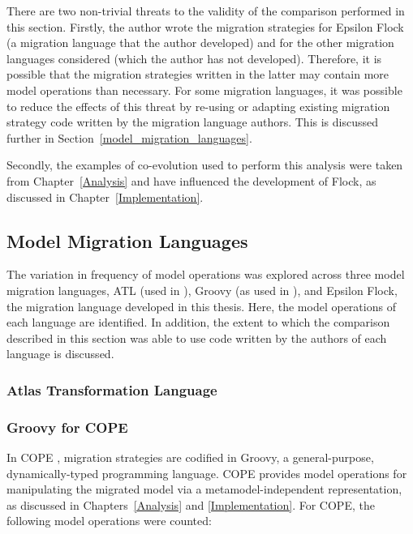There are two non-trivial threats to the validity of the comparison performed in this section. Firstly, the author wrote the migration strategies for Epsilon Flock (a migration language that the author developed) and for the other migration languages considered (which the author has not developed). Therefore, it is possible that the migration strategies written in the latter may contain more model operations than necessary. For some migration languages, it was possible to reduce the effects of this threat by re-using or adapting existing migration strategy code written by the migration language authors. This is discussed further in Section~\ref{model_migration_languages}.

Secondly, the examples of co-evolution used to perform this analysis were taken from Chapter~\ref{Analysis} and have influenced the development of Flock, as discussed in Chapter~\ref{Implementation}.  %


\subsection{Model Migration Languages}
\label{subsec:model_migration_languages}
The variation in frequency of model operations was explored across three model migration languages, ATL (used in  \cite{cicchetti,garces}), Groovy (as used in \cite{cope}), and Epsilon Flock, the migration language developed in this thesis. Here, the model operations of each language are identified. In addition, the extent to which the comparison described in this section was able to use code written by the authors of each language is discussed.


\subsubsection{Atlas Transformation Language}


\subsubsection{Groovy for COPE}
In COPE \cite{cope}, migration strategies are codified in Groovy, a general-purpose, dynamically-typed programming language. COPE provides model operations for manipulating the migrated model via a metamodel-independent representation, as discussed in Chapters~\ref{Analysis} and \ref{Implementation}. For COPE, the following model operations were counted:

